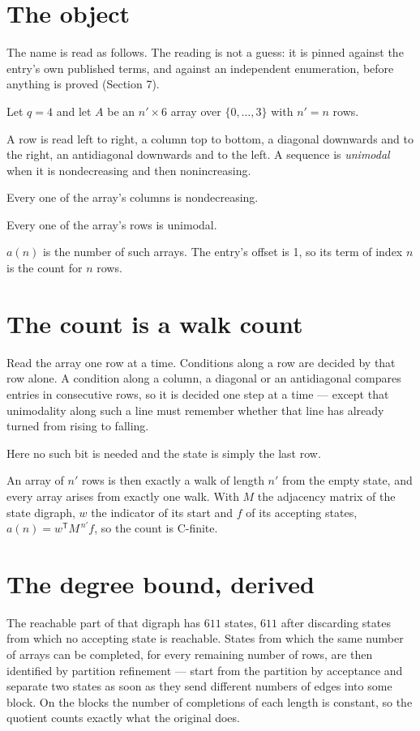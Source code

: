\documentclass[11pt]{article}
\theoremstyle{definition}
\begin{document}
\section{The object}

The name is read as follows. The reading is not a guess: it is pinned against the entry's own published terms, and against an independent enumeration, before anything is proved (Section 7).

Let $q = 4$ and let $A$ be an $n' \times 6$ array over $\{0,\dots,3\}$ with $n' = n$ rows.

A row is read left to right, a column top to bottom, a diagonal downwards and to the right, an antidiagonal downwards and to the left. A sequence is {\itshape unimodal} when it is nondecreasing and then nonincreasing.

Every one of the array's columns is nondecreasing.

Every one of the array's rows is unimodal.

$a(n)$ is the number of such arrays. The entry's offset is 1, so its term of index $n$ is the count for $n$ rows.

\section{The count is a walk count}

Read the array one row at a time. Conditions along a row are decided by that row alone. A condition along a column, a diagonal or an antidiagonal compares entries in consecutive rows, so it is decided one step at a time --- except that unimodality along such a line must remember whether that line has already turned from rising to falling.

Here no such bit is needed and the state is simply the last row.

An array of $n'$ rows is then exactly a walk of length $n'$ from the empty state, and every array arises from exactly one walk. With $M$ the adjacency matrix of the state digraph, $w$ the indicator of its start and $f$ of its accepting states, $a(n) = w^{\mathsf T}M^{\,n'}f$, so the count is C-finite.

\section{The degree bound, derived}

The reachable part of that digraph has $611$ states, $611$ after discarding states from which no accepting state is reachable. States from which the same number of arrays can be completed, for every remaining number of rows, are then identified by partition refinement --- start from the partition by acceptance and separate two states as soon as they send different numbers of edges into some block. On the blocks the number of completions of each length is constant, so the quotient counts exactly what the original does.
\end{document}
